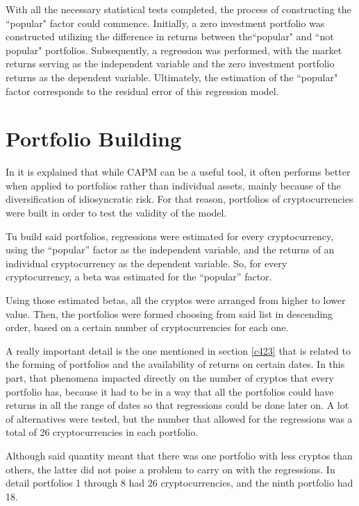With all the necessary statistical tests completed, the process of constructing the ``popular" factor could commence. Initially, a zero investment portfolio was constructed utilizing the difference in returns between the``popular" and ``not popular" portfolios. Subsequently, a regression was performed, with the market returns serving as the independent variable and the zero investment portfolio returns as the dependent variable. Ultimately, the estimation of the ``popular" factor corresponds to the residual error of this regression model.

\section{Portfolio Building}
In \parencite{fama2004capital} it is explained that while CAPM can be a useful tool, it often performs better when applied to portfolios rather than individual assets, mainly because of the diversification of idiosyncratic risk. For that reason, portfolios of cryptocurrencies were built in order to test the validity of the model.

Tu build said portfolios, regressions were estimated for every cryptocurrency, using the ``popular'' factor as the independent variable, and the returns of an individual cryptocurrency as the dependent variable. So, for every cryptocurrency, a beta was estimated for the ``popular'' factor.

Using those estimated betas, all the cryptos were arranged from higher to lower value. Then, the portfolios were formed choosing from said list in descending order, based on a certain number of cryptocurrencies for each one.

A really important detail is the one mentioned in section \ref{c423} that is related to the forming of portfolios and the availability of returns on certain dates. In this part, that phenomena impacted directly on the number of cryptos that every portfolio has, because it had to be in a way that all the portfolios could have returns in all the range of dates so that regressions could be done later on. A lot of alternatives were tested, but the number that allowed for the regressions was a total of 26 cryptocurrencies in each portfolio.

Although said quantity meant that there was one portfolio with less cryptos than others, the latter did not poise a problem to carry on with the regressions. In detail portfolios 1 through 8 had 26 cryptocurrencies, and the ninth portfolio had 18.

